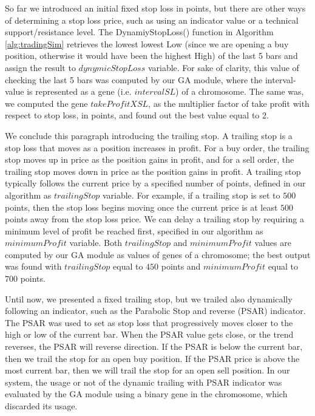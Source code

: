 So far we introduced an initial fixed stop loss in points, but there are other ways of determining a stop loss price, such as using an indicator value or a technical support/resistance level. The DynamiyStopLoss() function in Algorithm \ref{alg:tradingSim} retrieves the lowest lowest Low (since we are opening a buy position, otherwise it would have been the highest High) of the last 5 bars and assign the result to $dynymicStopLoss$ variable. For sake of clarity, this value of checking the last 5 bars was computed by our GA module, where the interval-value is represented as a gene (i.e. $intervalSL$) of a chromosome. The same was, we computed the gene $takeProfitXSL$, as the multiplier factor of take profit with respect to stop loss, in points, and found out the best value equal to 2.

We conclude this paragraph introducing the trailing stop. A trailing stop is a stop loss that moves as a position increases in profit. For a buy order, the trailing stop moves up in price as the position gains in profit, and for a sell order, the trailing stop moves down in price as the position gains in profit. A trailing stop typically follows the current price by a specified number of points, defined in our algorithm as $trailingStop$ variable. For example, if a trailing stop is set to $500$ points, then the stop loss begins moving once the current price is at least $500$ points away from the stop loss price. We can delay a trailing stop by requiring a minimum level of profit be reached first, specified in our algorithm as $minimumProfit$ variable. Both $trailingStop$ and $minimumProfit$ values are computed by our GA module as values of genes of a chromosome; the best output was found with $trailingStop$ equal to $450$ points and $minimumProfit$ equal to $700$ points. 

Until now, we presented a fixed trailing stop, but we trailed also dynamically following an indicator, such as the Parabolic Stop and reverse (PSAR) indicator. The PSAR was used to set as stop loss that progressively moves closer to the high or low of the current bar. When the PSAR value gets close, or the trend reverses, the PSAR will reverse direction. If the PSAR is below the current bar, then we trail the stop for an open buy position. If the PSAR price is above the most current bar, then we will trail the stop for an open sell position. In our system, the usage or not of the dynamic trailing with PSAR indicator was evaluated by the GA module using a binary gene in the chromosome, which discarded its usage.

